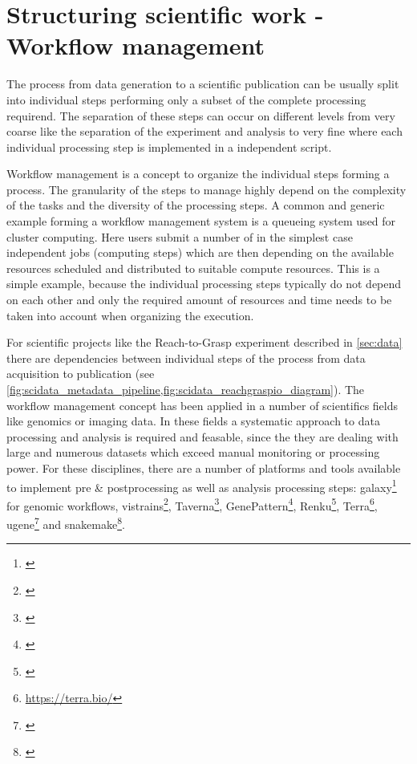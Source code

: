 \clearpage
\section{Structuring scientific work - Workflow management}
\label{sec:workflows}


The process from data generation to a scientific publication can be usually split into individual steps performing only a subset of the complete processing requirend. The separation of these steps can occur on different levels from very coarse like the separation of the experiment and analysis to very fine where each individual processing step is implemented in a independent script.

Workflow management is a concept to organize the individual steps forming a process. The granularity of the steps to manage highly depend on the complexity of the tasks and the diversity of the processing steps. A common and generic example forming a workflow management system is a queueing system used for cluster computing. Here users submit a number of in the simplest case independent jobs (computing steps) which are then depending on the available resources scheduled and distributed to suitable compute resources. This is a simple example, because the individual processing steps typically do not depend on each other and only the required amount of resources and time needs to be taken into account when organizing the execution.

For scientific projects like the Reach-to-Grasp experiment described in \cref{sec:data} there are dependencies between individual steps of the process from data acquisition to publication (see \cref{fig:scidata_metadata_pipeline,fig:scidata_reachgraspio_diagram}). The workflow management concept has been applied in a number of scientifics fields like genomics or imaging data. In these fields a systematic approach to data processing and analysis is required and feasable, since the they are dealing with large and numerous datasets which exceed manual monitoring or processing power. 
For these disciplines, there are a number of platforms and tools available to implement pre \& postprocessing as well as analysis processing steps: galaxy\footnote{\url{}} for genomic workflows, vistrains\footnote{\url{}}, Taverna\footnote{\url{}},  GenePattern\footnote{\url{}}, Renku\footnote{\url{}}, Terra\footnote{\url{https://terra.bio/}}, ugene\footnote{\url{}} and snakemake\footnote{\url{}}. 

